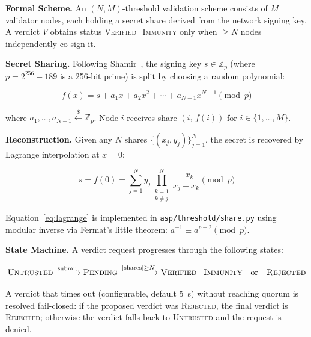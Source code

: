 \documentclass[sigconf,natbib=false]{acmart}
\begin{document}
\textbf{Formal Scheme.}
An $(N, M)$-threshold validation scheme consists of $M$ validator nodes,
each holding a secret share derived from the network signing key.
A verdict $V$ obtains status \textsc{Verified\_Immunity} only when
$\geq N$ nodes independently co-sign it.

\textbf{Secret Sharing.}
Following Shamir~\cite{shamir1979share}, the signing key $s \in \mathbb{Z}_p$
(where $p = 2^{256} - 189$ is a 256-bit prime) is split by choosing a
random polynomial:

\begin{equation}
\label{eq:shamir}
f(x) = s + a_1 x + a_2 x^2 + \cdots + a_{N-1} x^{N-1} \pmod{p}
\end{equation}

where $a_1, \ldots, a_{N-1} \overset{\$}{\leftarrow} \mathbb{Z}_p$.
Node $i$ receives share $(i,\, f(i))$ for $i \in \{1, \ldots, M\}$.

\textbf{Reconstruction.}
Given any $N$ shares $\{(x_j, y_j)\}_{j=1}^{N}$, the secret is recovered
by Lagrange interpolation at $x = 0$:

\begin{equation}
\label{eq:lagrange}
s = f(0) = \sum_{j=1}^{N} y_j \prod_{\substack{k=1\\k \neq j}}^{N}
  \frac{-x_k}{x_j - x_k} \pmod{p}
\end{equation}

Equation~\eqref{eq:lagrange} is implemented in \texttt{asp/threshold/share.py}
using modular inverse via Fermat's little theorem: $a^{-1} \equiv a^{p-2} \pmod{p}$.

\textbf{State Machine.}
A verdict request progresses through the following states:

\begin{equation}
\label{eq:statemachine}
\textsc{Untrusted}
  \xrightarrow{\text{submit}}
\textsc{Pending}
  \xrightarrow{|\text{shares}| \geq N}
\textsc{Verified\_Immunity}
  \quad \text{or} \quad
\textsc{Rejected}
\end{equation}

A verdict that times out (configurable, default 5~s) without reaching quorum
is resolved fail-closed: if the proposed verdict was \textsc{Rejected}, the
final verdict is \textsc{Rejected}; otherwise the verdict falls back to
\textsc{Untrusted} and the request is denied.
\end{document}
